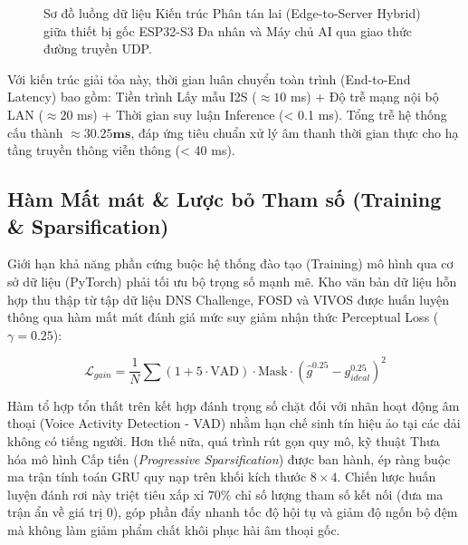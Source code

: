 \begin{figure}[H]
{
    }
    \caption{Sơ đồ luồng dữ liệu Kiến trúc Phân tán lai (Edge-to-Server Hybrid) giữa thiết bị gốc ESP32-S3 Đa nhân và Máy chủ AI qua giao thức đường truyền UDP.}
    \label{fig:edge_to_server}
\end{figure}

Với kiến trúc giải tỏa này, thời gian luân chuyển toàn trình (End-to-End Latency) bao gồm: Tiền trình Lấy mẫu I2S ($\approx 10$ ms) + Độ trễ mạng nội bộ LAN ($\approx 20$ ms) + Thời gian suy luận Inference (< 0.1 ms). Tổng trễ hệ thống cấu thành $\mathbf{\approx 30.25 ms}$, đáp ứng tiêu chuẩn xử lý âm thanh thời gian thực cho hạ tầng truyền thông viễn thông (< 40 ms).

\subsection{Hàm Mất mát \& Lược bỏ Tham số (Training \& Sparsification)}
Giới hạn khả năng phần cứng buộc hệ thống đào tạo (Training) mô hình qua cơ sở dữ liệu (PyTorch) phải tối ưu bộ trọng số mạnh mẽ. Kho văn bản dữ liệu hỗn hợp thu thập từ tập dữ liệu DNS Challenge, FOSD và VIVOS được huấn luyện thông qua hàm mất mát đánh giá mức suy giảm nhận thức Perceptual Loss ($\gamma=0.25$):

\begin{equation}
    \mathcal{L}_{gain} = \frac{1}{N} \sum (1 + 5 \cdot \text{VAD}) \cdot \text{Mask} \cdot (\hat{g}^{0.25} - g_{ideal}^{0.25})^2
\end{equation}

Hàm tổ hợp tổn thất trên kết hợp đánh trọng số chặt đối với nhãn hoạt động âm thoại (Voice Activity Detection - VAD) nhằm hạn chế sinh tín hiệu ảo tại các dải không có tiếng người. Hơn thế nữa, quá trình rút gọn quy mô, kỹ thuật Thưa hóa mô hình Cấp tiến (\textit{Progressive Sparsification}) được ban hành, ép ràng buộc ma trận tính toán GRU quy nạp trên khối kích thước $8\times4$. Chiến lược huấn luyện đánh rơi này triệt tiêu xấp xỉ $70\%$ chỉ số lượng tham số kết nối (đưa ma trận ẩn về giá trị $0$), góp phần đẩy nhanh tốc độ hội tụ và giảm độ ngốn bộ đệm mà không làm giảm phẩm chất khôi phục hài âm thoại gốc.
